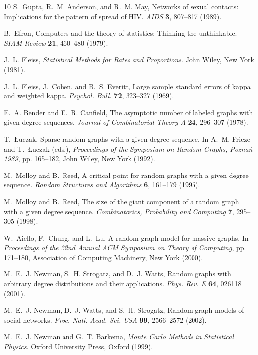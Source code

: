 \documentclass[twocolumn,pre]{revtex4}
\begin{document}
\begin{thebibliography}{10}
S.~Gupta, R.~M. Anderson, and R.~M. May, Networks of sexual contacts:
  Implications for the pattern of spread of {HIV}. \textit{AIDS} \textbf{3},
  807--817 (1989).

B.~Efron, Computers and the theory of statistics: Thinking the unthinkable.
  \textit{SIAM Review} \textbf{21}, 460--480 (1979).

J.~L. Fleiss, \textit{Statistical Methods for Rates and Proportions}. John
  Wiley, New York (1981).

J.~L. Fleiss, J.~Cohen, and B.~S. Everitt, Large sample standard errors of
  kappa and weighted kappa. \textit{Psychol. Bull.} \textbf{72}, 323--327
  (1969).

E.~A. Bender and E.~R. Canfield, The asymptotic number of labeled graphs with
  given degree sequences. \textit{Journal of Combinatorial Theory A}
  \textbf{24}, 296--307 (1978).

T.~\L{}uczak, Sparse random graphs with a given degree sequence. In A.~M.
  Frieze and T.~\L{}uczak (eds.), \textit{Proceedings of the Symposium on
  Random Graphs, Pozna\'n 1989}, pp. 165--182, John Wiley, New York (1992).

M.~Molloy and B.~Reed, A critical point for random graphs with a given degree
  sequence. \textit{Random Structures and Algorithms} \textbf{6}, 161--179
  (1995).

M.~Molloy and B.~Reed, The size of the giant component of a random graph with a
  given degree sequence. \textit{Combinatorics, Probability and Computing}
  \textbf{7}, 295--305 (1998).

W.~Aiello, F.~Chung, and L.~Lu, A random graph model for massive graphs. In
  \textit{Proceedings of the 32nd Annual {ACM} Symposium on Theory of
  Computing}, pp. 171--180, Association of Computing Machinery, New York
  (2000).

M.~E.~J. Newman, S.~H. Strogatz, and D.~J. Watts, Random graphs with arbitrary
  degree distributions and their applications. \textit{Phys. Rev. E}
  \textbf{64}, 026118 (2001).

M.~E.~J. Newman, D.~J. Watts, and S.~H. Strogatz, Random graph models of social
  networks. \textit{Proc. Natl. Acad. Sci. USA} \textbf{99}, 2566--2572 (2002).

M.~E.~J. Newman and G.~T. Barkema, \textit{Monte Carlo Methods in Statistical
  Physics}. Oxford University Press, Oxford (1999).


\end{thebibliography}
\end{document}
